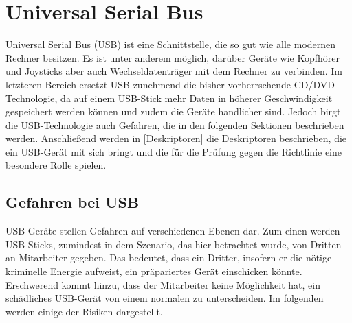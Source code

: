 \chapter{Universal Serial Bus}
Universal Serial Bus (USB) ist eine Schnittstelle, die so gut wie alle modernen Rechner besitzen. Es ist unter anderem möglich, darüber Geräte wie Kopfhörer und Joysticks aber auch Wechseldatenträger mit dem Rechner zu verbinden. Im letzteren Bereich ersetzt USB zunehmend die bisher vorherrschende CD/DVD-Technologie, da auf einem USB-Stick mehr Daten in höherer Geschwindigkeit gespeichert werden können und zudem die Geräte handlicher sind. Jedoch birgt die USB-Technologie auch Gefahren, die in den folgenden Sektionen beschrieben werden. Anschließend werden in \ref{Deskriptoren} die Deskriptoren beschrieben, die ein USB-Gerät mit sich bringt und die für die Prüfung gegen die Richtlinie eine besondere Rolle spielen.

\section{Gefahren bei USB}\label{GefBeiUSB}
USB-Geräte stellen Gefahren auf verschiedenen Ebenen dar. Zum einen werden USB-Sticks, zumindest in dem Szenario, das hier betrachtet wurde, von Dritten an Mitarbeiter gegeben. Das bedeutet, dass ein Dritter, insofern er die nötige kriminelle Energie aufweist, ein präpariertes Gerät einschicken könnte. Erschwerend kommt hinzu, dass der Mitarbeiter keine Möglichkeit hat, ein schädliches USB-Gerät von einem normalen zu unterscheiden. Im folgenden werden einige der Risiken dargestellt.

